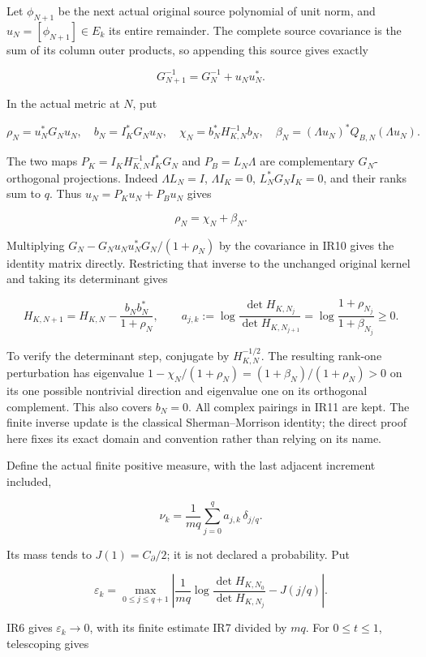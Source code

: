 \documentclass[10pt]{article}
\begin{document}
Let \(\phi_{N+1}\) be the next actual original source polynomial of unit norm, and \(u_N=[\phi_{N+1}]\in E_k\) its entire remainder. The complete source covariance is the sum of its column outer products, so appending this source gives exactly

\[
 G_{N+1}^{-1}=G_N^{-1}+u_Nu_N^*.
 \tag{IR10}
\]

In the actual metric at \(N\), put

\[
 \rho_N=u_N^*G_Nu_N,\quad b_N=I_K^*G_Nu_N,\quad
 \chi_N=b_N^*H_{K,N}^{-1}b_N,\quad
 \beta_N=(\Lambda u_N)^*Q_{B,N}(\Lambda u_N).
 \tag{IR11}
\]

The two maps \(P_K=I_KH_{K,N}^{-1}I_K^*G_N\) and \(P_B=L_N\Lambda\) are complementary \(G_N\)-orthogonal projections. Indeed \(\Lambda L_N=I\), \(\Lambda I_K=0\), \(L_N^*G_NI_K=0\), and their ranks sum to \(q\). Thus \(u_N=P_Ku_N+P_Bu_N\) gives

\[
 \rho_N=\chi_N+\beta_N.
 \tag{IR12}
\]

Multiplying \(G_N-G_Nu_Nu_N^*G_N/(1+\rho_N)\) by the covariance in IR10 gives the identity matrix directly. Restricting that inverse to the unchanged original kernel and taking its determinant gives

\[
 H_{K,N+1}=H_{K,N}-\frac{b_Nb_N^*}{1+\rho_N},\qquad
 \boxed{a_{j,k}:=\log\frac{\det H_{K,N_j}}{\det H_{K,N_{j+1}}}
 =\log\frac{1+\rho_{N_j}}{1+\beta_{N_j}}\ge0.}
 \tag{IR13}
\]

To verify the determinant step, conjugate by \(H_{K,N}^{-1/2}\). The resulting rank-one perturbation has eigenvalue \(1-\chi_N/(1+\rho_N)=(1+\beta_N)/(1+\rho_N)>0\) on its one possible nontrivial direction and eigenvalue one on its orthogonal complement. This also covers \(b_N=0\). All complex pairings in IR11 are kept. The finite inverse update is the classical Sherman--Morrison identity; the direct proof here fixes its exact domain and convention rather than relying on its name.

Define the actual finite positive measure, with the last adjacent increment included,

\[
 \nu_k=\frac1{mq}\sum_{j=0}^{q}a_{j,k}\,\delta_{j/q}.
 \tag{IR14}
\]

Its mass tends to \(J(1)=C_\partial/2\); it is not declared a probability. Put

\[
 \varepsilon_k=\max_{0\le j\le q+1}
 \left|\frac1{mq}\log\frac{\det H_{K,N_0}}{\det H_{K,N_j}}-J(j/q)\right|.
\]

IR6 gives \(\varepsilon_k\to0\), with its finite estimate IR7 divided by \(mq\). For \(0\le t\le1\), telescoping gives
\end{document}
